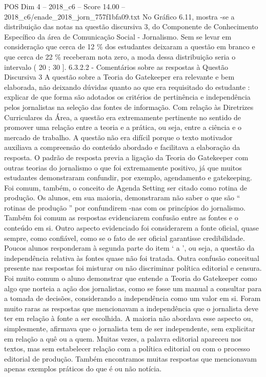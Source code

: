 \begin{textsample}{POS Dim 4 – 2018\_c6 – Score 14.00 – 2018\_c6/enade\_2018\_jorn\_757f1bfa09.txt}
No Gráfico 6.11, mostra -se a distribuição das notas na questão discursiva 3, do Componente de Conhecimento Específico da área de Comunicação Social - Jornalismo.
Sem se levar em consideração que cerca de 12 \% dos estudantes deixaram a questão em branco e que cerca de 22 \% receberam nota zero, a moda dessa distribuição seria o intervalo ( 20 ; 30 ]. 6.3.2.2 - Comentários sobre as respostas à Questão Discursiva 3 A questão sobre a Teoria do Gatekeeper era relevante e bem elaborada, não deixando dúvidas quanto ao que era requisitado do estudante : explicar de que forma são adotados os critérios de pertinência e independência pelos jornalistas na seleção das fontes de informação.
Com relação às Diretrizes Curriculares da Área, a questão era extremamente pertinente no sentido de promover uma relação entre a teoria e a prática, ou seja, entre a ciência e o mercado de trabalho.
A questão não era difícil porque o texto motivador auxiliava a compreensão do conteúdo abordado e facilitava a elaboração da resposta.
O padrão de resposta previa a ligação da Teoria do Gatekeeper com outras teorias do jornalismo o que foi extremamente positivo, já que muitos estudantes demonstraram confundir, por exemplo, agendamento e gatekeeping.
Foi comum, também, o conceito de Agenda Setting ser citado como rotina de produção.
Os alunos, em sua maioria, demonstraram não saber o que são “ rotinas de produção ” por confundirem -nas com os princípios do jornalismo.
Também foi comum as respostas evidenciarem confusão entre as fontes e o conteúdo em si.
Outro aspecto evidenciado foi considerarem a fonte oficial, quase sempre, como confiável, como se o fato de ser oficial garantisse credibilidade.
Poucos alunos responderam à segunda parte do item ‘ a ’, ou seja, a questão da independência relativa às fontes quase não foi tratada.
Outra confusão conceitual presente nas respostas foi misturar ou não discriminar política editorial e censura.
Foi muito comum o aluno demonstrar que entende a Teoria do Gatekeeper como algo que norteia a ação dos jornalistas, como se fosse um manual a consultar para a tomada de decisões, considerando a independência como um valor em si.
Foram muito raras as respostas que mencionavam a independência que o jornalista deve ter em relação à fonte a ser escolhida.
A maioria não abordava esse aspecto ou, simplesmente, afirmava que o jornalista tem de ser independente, sem explicitar em relação a quê ou a quem.
Muitas vezes, a palavra editorial apareceu nos textos, mas sem estabelecer relação com a política editorial ou com o processo editorial de produção.
Também encontramos muitas respostas que mencionavam apenas exemplos práticos do que é ou não notícia.

\end{textsample}
